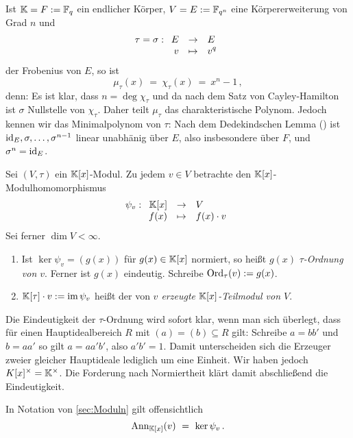 \begin{bemerkung}
  \label{bem:mipo_frob}
  Ist $\mathbb{K}  = F :=\mathbb{F}_q$ ein endlicher Körper, 
  $V = E := \mathbb{F}_{q^n}$ eine Körpererweiterung
  von Grad $n$ und 
  \[\tau = \sigma: \funcdef{E & \to & E\\
    v &\mapsto & v^q}\]
  der Frobenius von $E$, so ist
  \[ \mu_\tau(x) \ =\ \chi_\tau(x) \ =\ x^n - 1\,,\]
  denn: Es ist klar, dass $n = \deg \chi_\tau$ und da nach dem Satz von
  Cayley-Hamilton ist $\sigma$ Nullstelle von $\chi_\tau$. Daher teilt
  $\mu_\tau$ das charakteristische Polynom. Jedoch kennen wir das
  Minimalpolynom von $\tau$: Nach dem Dedekindschen Lemma
  () ist 
  $\operatorname{id}_E,\sigma,\ldots,\sigma^{n-1}$ linear unabhänig über $E$, also insbesondere
  über $F$, und $\sigma^n = \operatorname{id}_E$.
\end{bemerkung}


\begin{definition}
  Sei $(V,\tau)$ ein $\mathbb{K}[x]$-Modul. Zu jedem $v \in V$ betrachte den
  $\mathbb{K}[x]$-Modulhomomorphismus
  \[ \psi_v: \funcdef{\K[x] & \to & V \\
    f(x) & \mapsto & f(x)\cdot v }  \]
  Sei ferner $\dim V < \infty$.
  \begin{enumerate}
    \item Ist $\ker\psi_v = (g(x))$ für $g(x)\in \mathbb{K}[x]$ normiert, so heißt
      $g(x)$ \emph{$\tau$-Ordnung von $v$}\@. Ferner ist $g(x)$ eindeutig.
      Schreibe $\operatorname{Ord}_\tau(v) := g(x)$.
    \item $\mathbb{K}[\tau]\cdot v := \operatorname{im}{\psi_v}$ heißt der von \emph{$v$ erzeugte
      $\mathbb{K}[x]$-Teilmodul von $V$}.
  \end{enumerate}
\end{definition}

\begin{bemerkung}
  Die Eindeutigkeit der $\tau$-Ordnung wird sofort klar, wenn man sich
  überlegt, dass für einen Hauptidealbereich $R$ mit $(a) = (b) \subseteq R$ 
  gilt: Schreibe $a = b b'$ und $b = a a'$ so gilt $a = a a'b'$, also 
  $a'b' = 1$. Damit unterscheiden sich die Erzeuger zweier gleicher Hauptideale
  lediglich um eine Einheit. Wir haben jedoch $K[x]^\times = \mathbb{K}^\times$. Die
  Forderung nach Normiertheit klärt damit abschließend die Eindeutigkeit.
\end{bemerkung}


\begin{bemerkung}
  In Notation von \autoref{sec:Moduln} gilt offensichtlich
  \[ \operatorname{Ann}_{\mathbb{K}[x]}(v) \ =\  \ker\psi_v \,.\]
\end{bemerkung}

